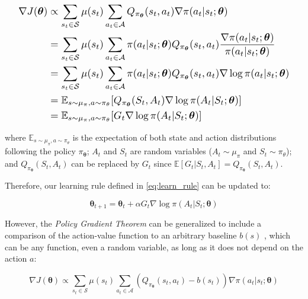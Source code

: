 \documentclass[twoside,twocolumn]{article}
\begin{document}
\begin{equation*}
\resizebox{.95\linewidth}{!}{%
  $\begin{split}
    \nabla J({\boldsymbol{\theta}}) &\propto
    \sum_{s_t \in \mathcal{S}} \mu (s_t) \sum_{a_t \in \mathcal{A}} Q_{\pi_{\boldsymbol{\theta}}}(s_t,a_t) \nabla \pi (a_t|s_t; \boldsymbol{\theta}) \\
    &=\sum_{s_t \in \mathcal{S}} \mu (s_t) \sum_{a_t \in \mathcal{A}} \pi (a_t|s_t; \boldsymbol{\theta}) Q_{\pi_{\boldsymbol{\theta}}}(s_t,a_t) \frac{\nabla \pi (a_t|s_t; \boldsymbol{\theta})}{\pi (a_t|s_t; \boldsymbol{\theta})} \\
    &=\sum_{s_t \in \mathcal{S}} \mu (s_t) \sum_{a_t \in \mathcal{A}} \pi (a_t|s_t; \boldsymbol{\theta}) Q_{\pi_{\boldsymbol{\theta}}}(s_t,a_t) \nabla \log{\pi (a_t|s_t; \boldsymbol{\theta})} \\
    &= \mathbb{E}_{s \sim \mu_{\pi}, a \sim \pi_{\theta}}[Q_{\pi_{\boldsymbol{\theta}}}(S_t,A_t) \nabla \log{\pi (A_t|S_t; \boldsymbol{\theta})}] \\
    &= \mathbb{E}_{s \sim \mu_{\pi}, a \sim \pi_{\theta}}[G_t \nabla \log{\pi (A_t|S_t; \boldsymbol{\theta})}] \\
  \end{split}
  $}
\end{equation*}


\noindent where $\mathbb{E}_{s \sim \mu_{\pi}, a \sim \pi_{\theta}}$ is the expectation of both state and action distributions following the policy $\pi_{\boldsymbol{\theta}}$; $A_t$ and $S_t$ are random variables ($A_t \sim \mu_{\pi}$ and $S_t \sim \pi_{\theta}$); and $Q_{\pi_{\boldsymbol{\theta}}}(S_t,A_t)$ can be replaced by $G_t$ since $\mathbb{E}[G_t| S_t,A_t] = Q_{\pi_{\boldsymbol{\theta}}}(S_t,A_t)$.

Therefore, our learning rule defined in \ref{eq:learn_rule} can be updated to:

\begin{equation*}
  \boldsymbol{\theta}_{t+1} = \boldsymbol{\theta}_{t} + \alpha G_t \nabla \log{\pi (A_t|S_t; \boldsymbol{\theta})}
\end{equation*}

However, the \emph{Policy Gradient Theorem} can be generalized to include a comparison of the action-value function to an arbitrary baseline $b(s)$ \cite{Sutton1998}, which can be any function, even a random variable, as long as it does not depend on the action $a$:

\begin{equation*}
  \nabla J({\boldsymbol{\theta}}) \propto
  \sum_{s_t \in \mathcal{S}} \mu (s_t) \sum_{a_t \in \mathcal{A}} \left( Q_{\pi_{\boldsymbol{\theta}}}(s_t,a_t) - b(s_t) \right) \nabla \pi (a_t|s_t; \boldsymbol{\theta})
\end{equation*}
\end{document}
